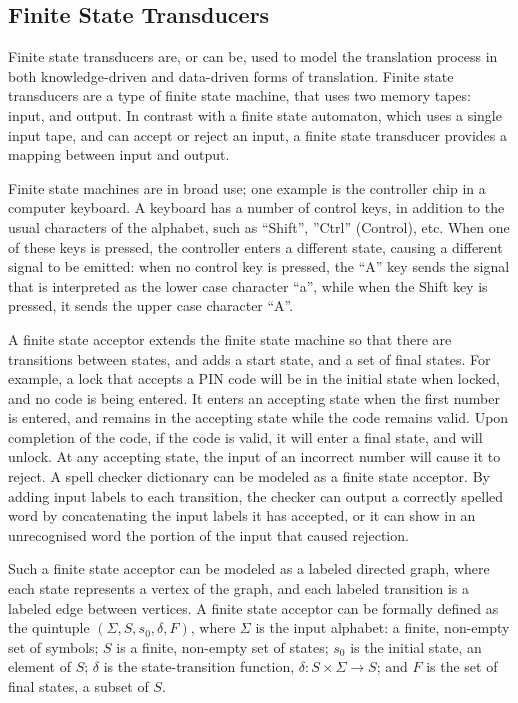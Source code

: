 \subsection{Finite State Transducers}

Finite state transducers are, or can be, used to model the translation process in both
knowledge-driven and data-driven forms of translation. Finite state transducers are a 
type of finite state machine, that uses two memory tapes: input, and output. In contrast
with a finite state automaton, which uses a single input tape, and can accept or reject
an input, a finite state transducer provides a mapping between input and output.

Finite state machines are in broad use; one example is the controller chip in a computer
keyboard. A keyboard has a number of control keys, in addition to the usual characters of
the alphabet, such as ``Shift'', ''Ctrl'' (Control), etc. When one of these keys is pressed,
the controller enters a different state, causing a different signal to be emitted: when no
control key is pressed, the ``A'' key sends the signal that is interpreted as the lower case
character ``a'', while when the Shift key is pressed, it sends the upper case character ``A''.

A finite state acceptor extends the finite state machine so that there are transitions between
states, and adds a start state, and a set of final states. For example, a lock that accepts
a PIN code will be in the initial state when locked, and no code is being entered. It enters
an accepting state when the first number is entered, and remains in the accepting state while
the code remains valid. Upon completion of the code, if the code is valid, it will enter a
final state, and will unlock. At any accepting state, the input of an incorrect number
will cause it to reject. A spell checker dictionary can be modeled as a finite state acceptor.
By adding input labels to each transition, the checker can output a correctly spelled word by
concatenating the input labels it has accepted, or it can show in an unrecognised word the
portion of the input that caused rejection. 

Such a finite state acceptor can be modeled as
a labeled directed graph, where each state represents a vertex of the graph, and each labeled
transition is a labeled edge between vertices. A finite state acceptor can be formally defined
as the quintuple $(\Sigma, S, s_0, \delta, F)$, where $\Sigma$ is the input alphabet: a finite,
non-empty set of symbols; $S$ is a finite, non-empty set of states; $s_0$ is the initial state,
an element of $S$; $\delta$ is the state-transition function, $\delta: S \times \Sigma \rightarrow S$;
and $F$ is the set of final states, a subset of $S$.

